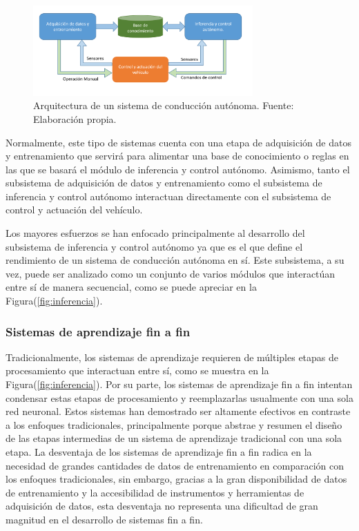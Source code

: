 
\begin{figure}[!h] 
    \centering
    \includegraphics[width=0.75\textwidth]{img/esquema}
    \caption{Arquitectura de un sistema de conducción autónoma. Fuente: Elaboración propia.}
    \label{fig:esquema}
    \end{figure}


Normalmente, este tipo de sistemas cuenta con una etapa de adquisición de datos y entrenamiento que servirá para 
alimentar una base de conocimiento o reglas en las que se basará el módulo de inferencia y control autónomo. 
Asimismo, tanto el subsistema de adquisición de datos y entrenamiento como el subsistema de inferencia y 
control autónomo interactuan directamente con el subsistema de control y actuación del vehículo. 

Los mayores esfuerzos se han enfocado principalmente al desarrollo del subsistema de inferencia y 
control autónomo ya que es el que define el rendimiento de un sistema de conducción autónoma en sí. 
Este subsistema, a su vez, puede ser analizado como un conjunto de varios módulos que interactúan 
entre sí de manera secuencial, como se puede apreciar en la Figura(\ref{fig:inferencia}). 

\subsubsection{Sistemas de aprendizaje fin a fin}
Tradicionalmente, los sistemas de aprendizaje requieren de múltiples etapas de procesamiento que interactuan entre sí, como se 
muestra en la Figura(\ref{fig:inferencia}). Por su parte, los sistemas de aprendizaje fin a fin intentan condensar 
estas etapas de procesamiento y reemplazarlas usualmente con una sola red neuronal. Estos sistemas han demostrado ser 
altamente efectivos en contraste a los enfoques tradicionales, principalmente porque abstrae y resumen el diseño de las 
etapas intermedias de un sistema de aprendizaje tradicional con una sola etapa. La desventaja de los 
sistemas de aprendizaje fin a fin radica en la necesidad de grandes cantidades de datos de entrenamiento 
en comparación con los enfoques tradicionales, sin embargo, gracias a la gran disponibilidad de datos de entrenamiento y 
la accesibilidad de instrumentos y herramientas de adquisición de datos, esta desventaja no representa una dificultad de 
gran magnitud en el desarrollo de sistemas fin a fin. 

